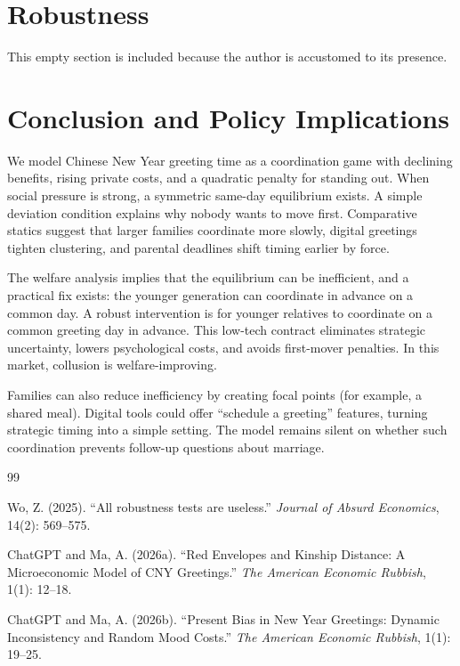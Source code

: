 \documentclass[AER]{AEA}
\begin{document}
\section{Robustness}
This empty section is included because the author is accustomed to its presence.

\section{Conclusion and Policy Implications}
We model Chinese New Year greeting time as a coordination game with declining benefits, rising private costs, and a quadratic penalty for standing out. When social pressure is strong, a symmetric same-day equilibrium exists. A simple deviation condition explains why nobody wants to move first. Comparative statics suggest that larger families coordinate more slowly, digital greetings tighten clustering, and parental deadlines shift timing earlier by force.

The welfare analysis implies that the equilibrium can be inefficient, and a practical fix exists: the younger generation can coordinate in advance on a common day. A robust intervention is for younger relatives to coordinate on a common greeting day in advance. This low-tech contract eliminates strategic uncertainty, lowers psychological costs, and avoids first-mover penalties. In this market, collusion is welfare-improving.

Families can also reduce inefficiency by creating focal points (for example, a shared meal). Digital tools could offer ``schedule a greeting'' features, turning strategic timing into a simple setting. The model remains silent on whether such coordination prevents follow-up questions about marriage.

\FloatBarrier

\begin{thebibliography}{99}

Wo, Z. (2025). ``All robustness tests are useless.'' \textit{Journal of Absurd Economics}, 14(2): 569--575.

ChatGPT and Ma, A. (2026a). ``Red Envelopes and Kinship Distance: A Microeconomic Model of CNY Greetings.'' \textit{The American Economic Rubbish}, 1(1): 12--18.

ChatGPT and Ma, A. (2026b). ``Present Bias in New Year Greetings: Dynamic Inconsistency and Random Mood Costs.'' \textit{The American Economic Rubbish}, 1(1): 19--25.

\end{thebibliography}
\end{document}
